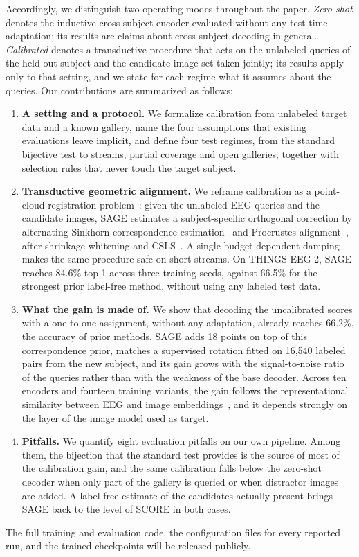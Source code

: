 \documentclass[10pt,twocolumn,letterpaper]{article}
\begin{document}
Accordingly, we distinguish two operating modes throughout the paper. \emph{Zero-shot} denotes the inductive cross-subject encoder evaluated without any test-time adaptation; its results are claims about cross-subject decoding in general. \emph{Calibrated} denotes a transductive procedure that acts on the unlabeled queries of the held-out subject and the candidate image set taken jointly; its results apply only to that setting, and we state for each regime what it assumes about the queries. Our contributions are summarized as follows:
\begin{enumerate}[leftmargin=1.3em,itemsep=1pt,topsep=2pt]
  \item \textbf{A setting and a protocol.}
    We formalize calibration from unlabeled target data and a known gallery, name the four assumptions that existing evaluations leave implicit, and define four test regimes, from the standard bijective test to streams, partial coverage and open galleries, together with selection rules that never touch the target subject.
  \item \textbf{Transductive geometric alignment.}
    We reframe calibration as a point-cloud registration problem~\cite{besl1992method,grave2019wasserstein}: given the unlabeled EEG queries and the candidate images, SAGE estimates a subject-specific orthogonal correction by alternating Sinkhorn correspondence estimation~\cite{cuturi2013sinkhorn} and Procrustes alignment~\cite{schonemann1966procrustes}, after shrinkage whitening and CSLS~\cite{conneau2018muse}. A single budget-dependent damping makes the same procedure safe on short streams. On THINGS-EEG-2, SAGE reaches 84.6\% top-1 across three training seeds, against 66.5\% for the strongest prior label-free method, without using any labeled test data.
  \item \textbf{What the gain is made of.}
    We show that decoding the uncalibrated scores with a one-to-one assignment, without any adaptation, already reaches 66.2\%, the accuracy of prior methods. SAGE adds 18 points on top of this correspondence prior, matches a supervised rotation fitted on 16{,}540 labeled pairs from the new subject, and its gain grows with the signal-to-noise ratio of the queries rather than with the weakness of the base decoder. Across ten encoders and fourteen training variants, the gain follows the representational similarity between EEG and image embeddings~\cite{kriegeskorte2008rsa}, and it depends strongly on the layer of the image model used as target.
  \item \textbf{Pitfalls.}
    We quantify eight evaluation pitfalls on our own pipeline. Among them, the bijection that the standard test provides is the source of most of the calibration gain, and the same calibration falls below the zero-shot decoder when only part of the gallery is queried or when distractor images are added. A label-free estimate of the candidates actually present brings SAGE back to the level of SCORE in both cases.
\end{enumerate}
The full training and evaluation code, the configuration files for every reported run, and the trained checkpoints will be released publicly.
\end{document}
